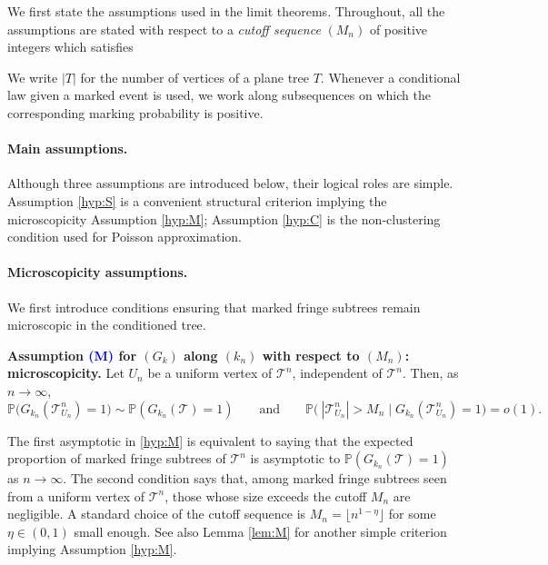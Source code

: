 \documentclass[a4paper,11pt]{article}
\makeatletter
\newcommand{\optionaldesc}[2]{%
  \phantomsection
  #1\protected@edef\@currentlabel{#1}\label{#2}%
}
\DeclareRobustCommand{\P}{\mathbb{P}}
\DeclareRobustCommand{\1}{\mathbf{1}}
\makeatother
\begin{document}
We first state the assumptions used in the limit theorems. Throughout, all the assumptions are stated with respect to a \emph{cutoff
sequence} $(M_n)$ of positive integers which satisfies 
\begin{center}
\end{center}
We write $|T|$ for the number of vertices of a plane tree $T$.
Whenever a conditional law given a marked event is used, we work along subsequences on which the corresponding marking probability is positive.


\paragraph{Main assumptions.} Although three assumptions are introduced below, their logical roles are simple. Assumption \ref{hyp:S} is a convenient structural criterion implying the microscopicity Assumption \ref{hyp:M}; Assumption \ref{hyp:C} is the non-clustering condition used for Poisson approximation.

\paragraph{Microscopicity assumptions.}
We first introduce conditions ensuring that marked fringe subtrees remain
microscopic in the conditioned tree.
\begin{mdframed}
\textbf{Assumption \textcolor{blue}{\optionaldesc{(M)}{hyp:M}} for $(G_k)$
along $(k_{n})$ with respect to $(M_{n})$: microscopicity.}
Let $U_n$ be a uniform vertex of $\mathcal T^n$, independent of
$\mathcal T^n$. Then, as $n \rightarrow \infty$,
$$
\P\bigl(G_{k_n}(\mathcal T^n_{U_n})=1\bigr)\sim \P(G_{k_n}(\mathcal T)=1)
\qquad \textrm{and} \qquad
\P\bigl(\ |\mathcal T^n_{U_n}|> M_n \mid G_{k_n}(\mathcal T^n_{U_n})=1\bigr)
=o(1).
$$
\end{mdframed}

The first asymptotic in \ref{hyp:M} is equivalent to saying that the
expected proportion of marked fringe subtrees of $\mathcal{T}^{n}$ is asymptotic to $\P(G_{k_n}(\mathcal T)=1)$ as
$n \rightarrow\infty$. The second condition says that,
among marked fringe subtrees seen from a uniform vertex of $\mathcal T^n$,
those whose size exceeds the cutoff $M_n$ are negligible. A standard choice of the cutoff sequence is $M_n = \lfloor n^{1-\eta} \rfloor$ for some $\eta \in (0,1)$ small enough.  See also
Lemma \ref{lem:M} for another simple criterion implying Assumption
\ref{hyp:M}.
\end{document}
